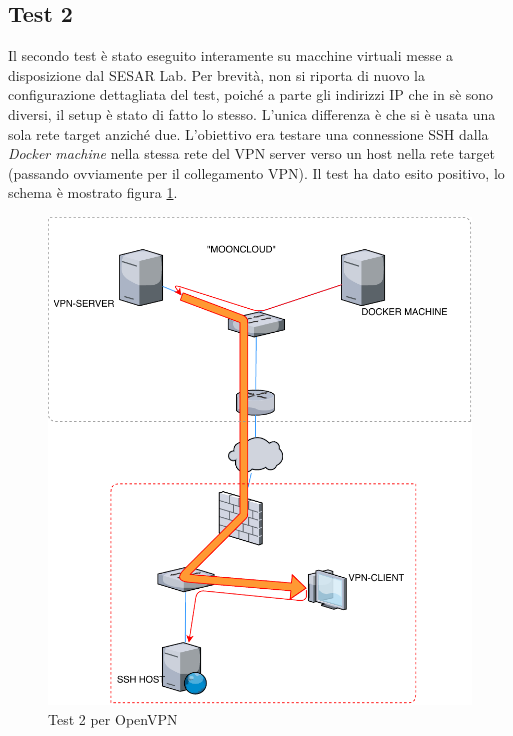 \subsection{Test 2}
Il secondo test è stato eseguito interamente su macchine virtuali messe
a disposizione dal SESAR Lab. Per brevità, non si riporta di nuovo la
configurazione dettagliata del test, poiché a parte gli indirizzi IP
che in sè sono diversi, il setup è stato di fatto lo stesso. L'unica
differenza è che si è usata una sola rete target anziché due.
L'obiettivo era testare una connessione SSH dalla \textit{Docker machine}
nella stessa rete del VPN server verso un host nella rete target (passando
ovviamente per il collegamento VPN).
Il test ha dato esito positivo, lo schema è mostrato figura \ref{fig:openvpn-test2}.
\begin{figure}
  \includegraphics[scale=0.55]{img/openvpn_test2}
  \caption{Test 2 per OpenVPN}
  \label{fig:openvpn-test2}
\end{figure}